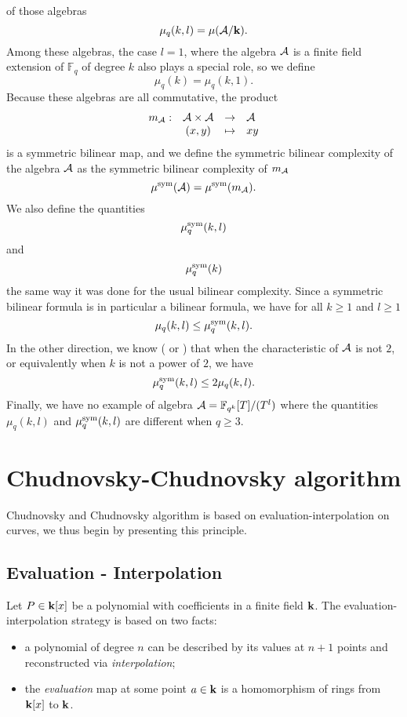 of those algebras
\[
  \mu_q(k, l) = \mu(\mathcal{A}/\mathbf{k}).
\]
Among these algebras, the case $l=1$, where the algebra $\mathcal{A}$ is a finite field
extension of $\mathbb{F}_q$ of degree $k$ also plays a special role, so we
define 
\[
  \mu_q(k) = \mu_q(k, 1).
\]
Because these algebras are all commutative, the product 
\[
\begin{array}{lccl}
  m_{\mathcal{A}}:&\mathcal{A}\times \mathcal{A}&\to&\mathcal{A}\\
  &(x, y)&\mapsto&xy
\end{array}
\]
is a symmetric bilinear map, and we define the symmetric bilinear complexity of
the algebra $\mathcal{A}$ as the symmetric bilinear complexity of $m_{\mathcal{A}}$
\[
  \mu^{\textrm{sym}}(\mathcal{A}) = \mu^{\textrm{sym}}(m_{\mathcal{A}}).
\]
We also define the quantities
\[
  \mu^{\textrm{sym}}_q(k, l)
\]
and 
\[
  \mu^{\textrm{sym}}_q(k)
\]
the same way it was done for the usual bilinear complexity. Since a symmetric
bilinear formula is in particular a bilinear formula, we have for all $k\geq1$
and $l\geq1$
\[
  \mu_q(k, l)\leq\mu^{\textrm{sym}}_q(k, l).
\]
In the other direction, we know (\cite[Theorem $1$]{SL84} or \cite[Lemma
$1.6$]{Randriam12}) that when the characteristic of $\mathcal{A}$ is not $2$,
or equivalently when $k$ is not a power of $2$, we have
\[
  \mu^{\textrm{sym}}_q(k, l)\leq2\mu_q(k, l).
\]
Finally, we have no example of algebra $\mathcal{A} = \mathbb{F}_{q^k}[T]/(T^l)$ where the
quantities $\mu_q(k, l)$ and $\mu^{\textrm{sym}}_q(k, l)$ are different when $q\geq3$.

\section{Chudnovsky-Chudnovsky algorithm}
Chudnovsky and Chudnovsky algorithm is based on evaluation-interpolation on
curves, we thus begin by presenting this principle.
\subsection{Evaluation - Interpolation}
\label{sec:evalinter}

Let $P\in\mathbf{k}[x]$ be a polynomial with coefficients in a finite field $\mathbf{k}$. The
evaluation-interpolation strategy is based on two facts:
\begin{itemize}
  \item a polynomial of degree $n$ can be described by its values at $n+1$
    points and reconstructed via \emph{interpolation};
  \item the \emph{evaluation} map at some point $a\in\mathbf{k}$ is a homomorphism of rings from
    $\mathbf{k}[x]$ to $\mathbf{k}$.
\end{itemize}

